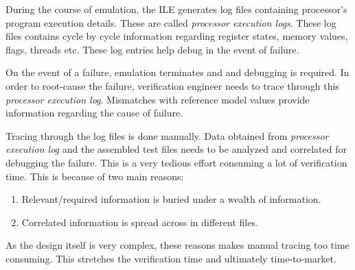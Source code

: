 \label{verif:exelog}

During the course of emulation, the ILE generates log files containing processor's program execution details. These are called {\it processor execution logs}. These log files contains cycle by cycle information regarding register states, memory values, flags, threads etc. These log entries help debug in the event of failure.

On the event of a failure, emulation terminates and and debugging is required. In order to root-cause the failure, verification engineer needs to trace through this {\it processor execution log}. Mismatches with reference model values provide information regarding the cause of failure.

Tracing through the log files is done manually. Data obtained from {\it processor execution log} and the assembled test files needs to be analyzed and correlated for debugging the failure. This is a very tedious effort consuming a lot of verification time. This is because of two main reasons:

\begin{enumerate}
	\item Relevant/required information is buried under a wealth of information.
	\item Correlated information is spread across in different files.
\end{enumerate}

As the design itself is very complex, these reasons makes manual tracing too time consuming. This stretches the verification time and ultimately time-to-market.   


